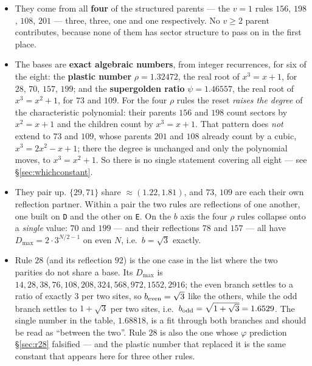 \documentclass[11pt]{article}
\newcommand{\rt}[1]{\texttt{#1}}
\theoremstyle{plain}
\theoremstyle{definition}
\begin{document}
\begin{itemize}
\item They come from all \textbf{four} of the structured parents --- the $v=1$
  rules $156$, $198$, $108$, $201$ --- three, three, one and one respectively.
  No $v\ge2$ parent contributes, because none of them has sector structure to
  pass on in the first place.
\item The bases are \textbf{exact algebraic numbers}, from integer recurrences,
  for six of the eight: the \textbf{plastic number} $\rho=1.32472$, the real root
  of $x^3=x+1$, for $28$, $70$, $157$, $199$; and the \textbf{supergolden ratio}
  $\psi=1.46557$, the real root of $x^3=x^2+1$, for $73$ and $109$. For the four
  $\rho$ rules the reset \emph{raises the degree} of the characteristic
  polynomial: their parents $156$ and $198$ count sectors by
  $x^2=x+1$ and the children count by $x^3=x+1$. That pattern does \emph{not}
  extend to $73$ and $109$, whose parents $201$ and $108$ already count by a
  cubic, $x^3=2x^2-x+1$; there the degree is unchanged and only the polynomial
  moves, to $x^3=x^2+1$. So there is no single statement covering all eight ---
  see \S\ref{sec:whichconstant}.
\item They pair up. $\{29,71\}$ share $\approx(1.22,1.81)$, and $73$, $109$ are
  each their own reflection partner. Within a pair the two rules are reflections
  of one another, one built on \rt{D} and the other on \rt{E}. On the $b$ axis
  the four $\rho$ rules collapse onto a \emph{single} value: $70$ and $199$ ---
  and their reflections $78$ and $157$ --- all have $D_{\max}=2\cdot3^{N/2-1}$ on
  even $N$, i.e.\ $b=\sqrt3$ exactly.
\item Rule $28$ (and its reflection $92$) is the one case in the list where the
  two parities do not share a base. Its $D_{\max}$ is
  $14,28,38,76,108,208,324,568,972,1552,2916$; the even branch settles to a ratio
  of exactly $3$ per two sites, so $b_{\rm even}=\sqrt3$ like the others, while
  the odd branch settles to $1+\sqrt3$ per two sites, i.e.\
  $b_{\rm odd}=\sqrt{1+\sqrt3}=1.6529$. The single number in the table,
  $1.68818$, is a fit through both branches and should be read as ``between the
  two''. Rule $28$ is also the one whose $\varphi$ prediction \S\ref{sec:r28}
  falsified --- and the plastic number that replaced it is the same constant that
  appears here for three other rules.
\end{itemize}
\end{document}
